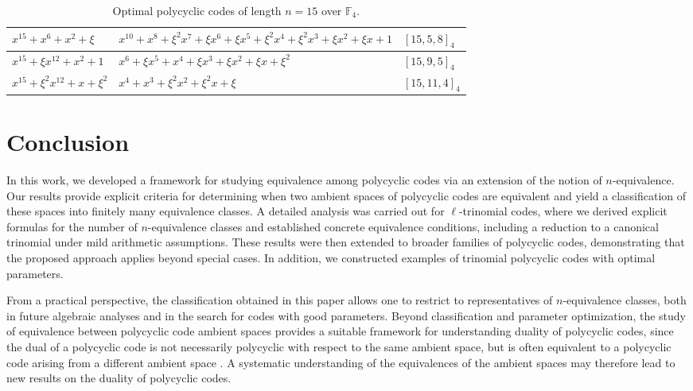 \documentclass[12pt]{elsarticle}
\theoremstyle{break}
{\theorembodyfont{\upshape}
    \newtheorem{theorem}{Theorem}[section] %
    \newtheorem{lemma}[theorem]{Lemma} %
    \newtheorem{proposition}[theorem]{Proposition}
    \newtheorem{corollary}[theorem]{Corollary}
    \newtheorem{definition}[theorem]{Definition}
    \newtheorem{example}[theorem]{Example}
    \newtheorem{remark}[theorem]{Remark}
    \newtheorem{conjecture}[theorem]{Conjecture}
    \newtheorem*{proof}{{Proof}}
	\newtheorem*{notation}{Notation}
	\newtheorem*{main}{Cain Theorem}
	\newtheorem*{problem}{Problem}
}
\begin{document}
\begin{example}[Polycyclic codes of length $n=15$ over $\mathbb{F}_4$ ]
\begin{enumerate}
\begin{table}[h]
{\begin{tabular}{|l|l|l|}
        \hline
        $x^{15} + x^6 + x^2 + \xi$ & $x^{10} + x^8 + \xi^2 x^7 + \xi x^6 + \xi x^5 + \xi^2 x^4 + \xi^2 x^3 + \xi x^2 + \xi x + 1$ &  $[15, 5, 8]_4$ \\
        \hline
      $x^{15} + \xi x^{12} + x^2 + 1$ &  $x^6 + \xi x^5 + x^4 + \xi x^3 + \xi x^2 + \xi x + \xi^2$ &  $[15, 9, 5]_4$ \\
        \hline
        $x^{15} + \xi^2 x^{12} + x + \xi^2$ & $x^4 + x^3 + \xi^2 x^2 + \xi^2 x + \xi$ &  $[15, 11, 4]_4$ \\
        \hline
    \end{tabular}}
 \caption{Optimal polycyclic codes of length $n=15$ over   $\mathbb{F}_{4} $.}
    \label{Tab2}
\end{table}

 \end{enumerate}

\end{example}
 



\section{Conclusion}\label{sec:conclusion}

In this work, we developed a framework for studying equivalence among polycyclic codes via an extension of the notion of $n$-equivalence. Our results provide explicit criteria for determining when two ambient spaces of polycyclic codes are equivalent and yield a classification of these spaces into finitely many equivalence classes. A detailed analysis was carried out for $\ell$-trinomial codes, where we derived explicit formulas for the number of $n$-equivalence classes and established concrete equivalence conditions, including a reduction to a canonical trinomial under mild arithmetic assumptions. These results were then extended to broader families of polycyclic codes, demonstrating that the proposed approach applies beyond special cases. In addition, we constructed examples of trinomial polycyclic codes with optimal parameters.

From a practical perspective, the classification obtained in this paper allows one to restrict to representatives of $n$-equivalence classes, both in future algebraic analyses and in the search for codes with good parameters. Beyond classification and parameter optimization, the study of equivalence between polycyclic code ambient spaces provides a suitable framework for understanding duality of polycyclic codes, since the dual of a polycyclic code is not necessarily polycyclic with respect to the same ambient space, but is often equivalent to a polycyclic code arising from a different ambient space \cite{Ouazzou2023,Shi2023,Aydin2022}. A systematic understanding of the equivalences of the ambient spaces may therefore lead to new results on the duality of polycyclic codes.
\end{document}
